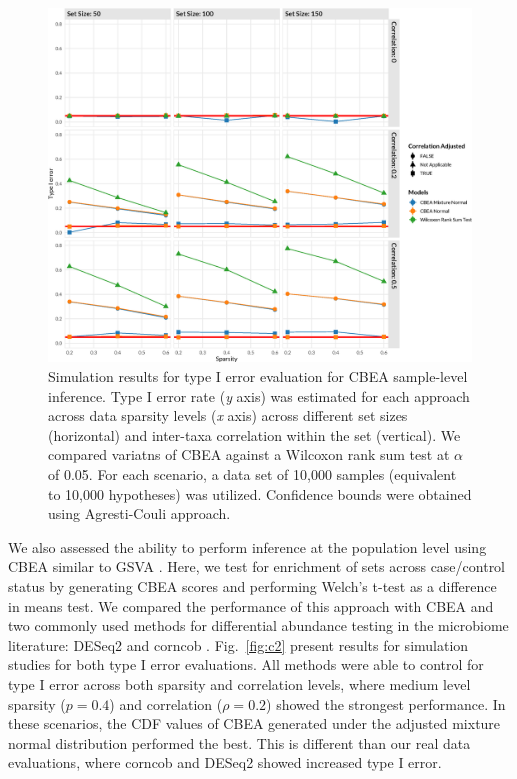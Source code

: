 \begin{figure}[!h]
    \centering
    \includegraphics[width=\linewidth]{figures/appC_fs1.eps}
    \caption[Simulation results for type I error evaluation for CBEA sample-level inference]{Simulation results for type I error evaluation for CBEA sample-level inference. Type I error rate (\emph{y} axis) was estimated for each approach across data sparsity levels (\emph{x} axis) across different set sizes (horizontal) and inter-taxa correlation within the set (vertical). We compared variatns of CBEA against a Wilcoxon rank sum test at $\alpha$ of 0.05. For each scenario, a data set of 10,000 samples (equivalent to 10,000 hypotheses) was utilized. Confidence bounds were obtained using Agresti-Couli approach.}
    \label{fig:c1}
\end{figure}

We also assessed the ability to perform inference at the population level using CBEA similar to GSVA \cite{hanzelmann2013gsva}. Here, we test for enrichment of sets across case/control status by generating CBEA scores and performing Welch's t-test as a difference in means test. We compared the performance of this approach with CBEA and two commonly used methods for differential abundance testing in the microbiome literature: DESeq2 \cite{love2014moderated} and corncob \cite{martin2020modeling}. Fig.~\ref{fig:c2} present results for simulation studies for both type I error evaluations. All methods were able to control for type I error across both sparsity and correlation levels, where medium level sparsity ($p = 0.4$) and correlation ($\rho = 0.2$) showed the strongest performance. In these scenarios, the CDF values of CBEA generated under the adjusted mixture normal distribution performed the best. This is different than our real data evaluations, where corncob and DESeq2 showed increased type I error. 

